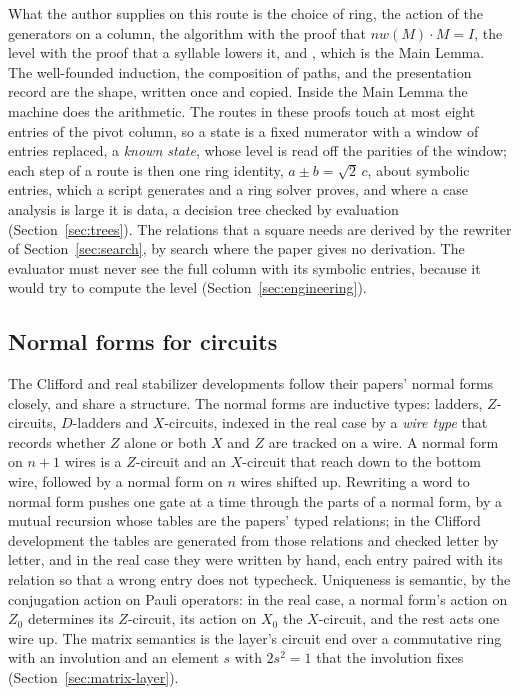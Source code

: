 What the author supplies on this route is the choice of ring, the
action of the generators on a column, the algorithm  with the
proof that $\mathit{nw}(M)\cdot M=I$, the level with the proof that a
syllable lowers it, and , which is the Main Lemma. The
well-founded induction, the composition of paths,  and the
presentation record are the shape, written once and copied. Inside the
Main Lemma the machine does the arithmetic. The routes in these proofs
touch at most eight entries of the pivot column, so a state is a fixed
numerator with a window of entries replaced, a \emph{known state},
whose level is read off the parities of the window; each step of a
route is then one ring identity, $a\pm b = \sqrt2\, c$, about symbolic
entries, which a script generates and a ring solver proves, and where
a case analysis is large it is data, a decision tree checked by
evaluation (Section~\ref{sec:trees}). The relations that a square
needs are derived by the rewriter of Section~\ref{sec:search}, by
search where the paper gives no derivation. The evaluator must never
see the full column with its symbolic entries, because it would try to
compute the level (Section~\ref{sec:engineering}).

\subsection{Normal forms for circuits}\label{sec:nf}

The Clifford and real stabilizer developments follow their papers'
normal forms closely, and share a structure. The normal forms are
inductive types: ladders, $Z$-circuits, $D$-ladders and $X$-circuits,
indexed in the real case by a \emph{wire type} that records whether
$Z$ alone or both $X$ and $Z$ are tracked on a wire. A normal form on
$n+1$ wires is a $Z$-circuit and an $X$-circuit that reach down to the
bottom wire, followed by a normal form on $n$ wires shifted up.
Rewriting a word to normal form pushes one gate at a time through the
parts of a normal form, by a mutual recursion whose tables are the
papers' typed relations; in the Clifford development the tables are
generated from those relations and checked letter by letter, and in
the real case they were written by hand, each entry paired with its
relation so that a wrong entry does not typecheck. Uniqueness is
semantic, by the conjugation action on Pauli operators: in the real
case, a normal form's action on $Z_0$ determines its $Z$-circuit, its
action on $X_0$ the $X$-circuit, and the rest acts one wire up. The
matrix semantics is the layer's circuit end over a commutative ring
with an involution and an element $s$ with $2s^2=1$ that the involution
fixes (Section~\ref{sec:matrix-layer}).

